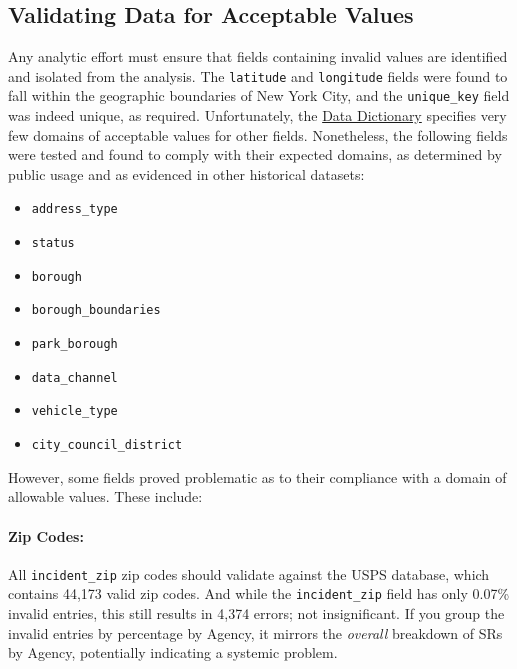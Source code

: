 \documentclass[linenumber]{jdsart}
\begin{document}
\subsection{Validating Data for Acceptable Values}
\label{sec:domain}
Any analytic effort must ensure that fields containing invalid values 
are identified and isolated from the analysis. The \texttt{latitude} 
and \texttt{longitude} fields were found to fall within the 
geographic boundaries of New York City, and 
the \texttt{unique\_key} field was indeed unique, as required. 
Unfortunately, the \href{https://data.cityofnewyork.us/api/views/erm2-nwe9/files/b372b884-f86a-453b-ba16-1fe06ce9d212?download=true&filename=311_ServiceRequest_2010-Present_DataDictionary_Updated_2023.xlsx}{Data Dictionary} specifies very few domains of 
acceptable values for other fields. Nonetheless, the following fields were tested and found to comply with their expected domains, as determined by public 
usage and as evidenced in other historical datasets:

\begin{itemize}
    \item \texttt{address\_type}
    \item \texttt{status}
    \item \texttt{borough}
    \item \texttt{borough\_boundaries}
    \item \texttt{park\_borough}
    \item \texttt{data\_channel}
    \item \texttt{vehicle\_type}
    \item \texttt{city\_council\_district}
\end{itemize}

However,  some fields proved problematic as to their 
compliance with a domain of allowable values. These include: 

\paragraph{Zip Codes:}
\label{sec:zipcodesissues}
All \texttt{incident\_zip} zip codes should 
validate against the USPS database, which contains 
44,173 valid zip codes. And while the \texttt{incident\_zip} field has 
only 0.07\% invalid entries, this still results in 4,374 errors; 
not insignificant. If you group the invalid entries by 
percentage by Agency, it mirrors the \textit{overall} 
breakdown of SRs by Agency, potentially 
indicating a systemic problem.
\end{document}
